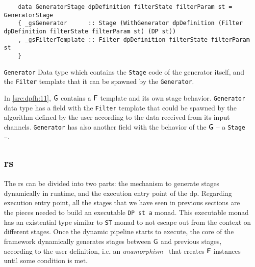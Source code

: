 \begin{listing}[H]
  \begin{verbatim}
    data GeneratorStage dpDefinition filterState filterParam st = GeneratorStage
    { _gsGenerator      :: Stage (WithGenerator dpDefinition (Filter dpDefinition filterState filterParam st) (DP st))
    , _gsFilterTemplate :: Filter dpDefinition filterState filterParam st
    }  
  \end{verbatim}
  \caption[{[\texttt{Stage.hs}] Generator}]{\texttt{Generator} Data type which contains the \texttt{Stage} code of the generator itself, and the \texttt{Filter} template that it can be spawned by the \texttt{Generator}.}
  \label{src:dpfh:11}
\end{listing}

In \autoref{src:dpfh:11}, $\mathsf{G}$ contains a $\mathsf{F}$ template and its own stage behavior.
\texttt{Generator} data type has a field with the \texttt{Filter} template that could be spawned by the algorithm defined by the user according to the data received from its input channels.
\texttt{Generator} has also another field with the behavior of the $\mathsf{G}$ -- a \texttt{Stage} --. 

\subsection{\acrfull{rs}}
The \acrshort{rs} can be divided into two parts: the mechanism to generate stages dynamically in runtime, and the execution entry point of the \acrshort{dp}.
Regarding execution entry point, all the stages that we have seen in previous sections are the pieces needed to build an executable \texttt{DP st a} monad.
This executable monad has an existential type similar to \texttt{ST} monad to not escape out from the context on different stages.
Once the dynamic pipeline starts to execute, the core of the framework dynamically generates stages between $\mathsf{G}$ and previous stages, according to the user definition, i.e. an \emph{anamorphism}~\cite{lenses} that creates $\mathsf{F}$ instances until some condition is met.

